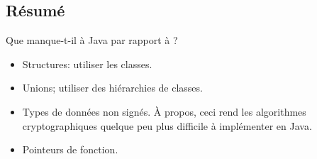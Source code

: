 \subsection{Résumé}

Que manque-t-il à Java par rapport à \CCpp?

\begin{itemize}
\item Structures: utiliser les classes.

\item Unions; utiliser des hiérarchies de classes.

\item Types de données non signés.
À propos, ceci rend les algorithmes cryptographiques quelque peu plus difficile à
implémenter en Java.

\item Pointeurs de fonction.
\end{itemize}
